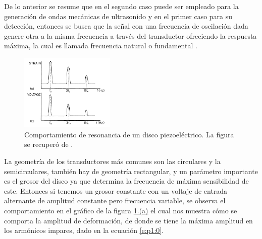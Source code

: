 \begin{enumerate}
\begin{adjustbox}{valign=T,raise=\strutheight,minipage={\linewidth}}
    \end{adjustbox}

    De lo anterior se resume que en el segundo caso puede ser empleado para la generación de ondas mecánicas de ultrasonido y en el primer caso para su detección, entonces se busca que la señal con una frecuencia de oscilación dada genere otra a la misma frecuencia a través del transductor ofreciendo la respuesta máxima, la cual es llamada frecuencia natural o fundamental  \citep{matthew}.
    
    




    \begin{adjustbox}{valign=T,raise=\strutheight,minipage={\linewidth}}
      \begin{figure}
        \centering
        \captionsetup{margin=5pt}
        \includegraphics[width=0.4\textwidth]{./figuras/p1_1.pdf}
        \caption{Comportamiento de resonancia de un disco piezoeléctrico. La figura se recuperó de \citet{matthew}.}
        \label{p1:1}
      \end{figure}
    \strut{}  
    
    La geometría de los transductores más comunes son las circulares y la semicirculares, también hay de geometría rectangular, y un parámetro importante es el grosor del disco ya que determina la frecuencia de máxima sensibilidad de este. Entonces si tenemos un grosor constante con un voltaje de entrada alternante de amplitud constante pero frecuencia variable, se observa el comportamiento en el gráfico de la figura \hyperref[p1:1]{\ref{p1:1}.(a)} el cual nos muestra cómo se comporta la amplitud de deformación, de donde se tiene la máxima amplitud en los armónicos impares, dado en la ecuación \ref{e:p1:0}.

  \end{adjustbox}

\pagebreak


\end{enumerate}
